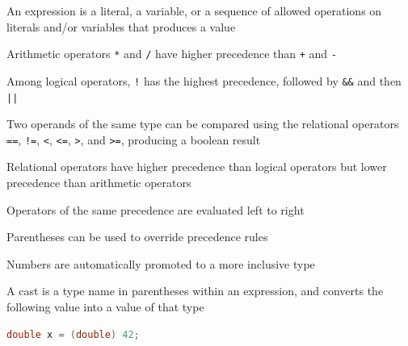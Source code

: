 \documentclass[8pt,a4paper,compress]{beamer}
\begin{document}
\begin{frame}[fragile]
\pause

An expression is a literal, a variable, or a sequence of allowed operations on literals and/or variables that produces a value

\pause
\bigskip

Arithmetic operators \lstinline{*} and \lstinline{/} have higher precedence than \lstinline{+} and \lstinline{-}

\pause
\bigskip

Among logical operators, \lstinline{!} has the highest precedence, followed by \lstinline{&&} and then \lstinline{||}

\pause
\bigskip

Two operands of the same type can be compared using the relational operators \lstinline{==}, \lstinline{!=}, \lstinline{<}, \lstinline{<=}, \lstinline{>}, and \lstinline{>=}, producing a boolean result

\pause
\bigskip

Relational operators have higher precedence than logical operators but lower precedence than arithmetic operators

\pause
\bigskip

Operators of the same precedence are evaluated left to right

\pause
\bigskip

Parentheses can be used to override precedence rules

\pause
\bigskip

Numbers are automatically promoted to a more inclusive type

\pause
\bigskip

A cast is a type name in parentheses within an expression, and converts the following value into a value of that type
\begin{lstlisting}[language=Java]
double x = (double) 42;
\end{lstlisting}
\end{frame}
\end{document}
